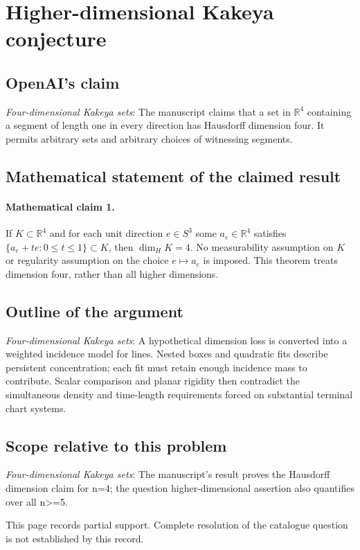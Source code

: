 \documentclass[11pt]{article}
\begin{document}
\section*{Higher-dimensional Kakeya conjecture}

\subsection{OpenAI's claim}
\textit{Four-dimensional Kakeya sets}: The manuscript claims that a set in $\mathbb R^4$ containing a segment of length one in every direction has Hausdorff dimension four. It permits arbitrary sets and arbitrary choices of witnessing segments.

\subsection{Mathematical statement of the claimed result}
\paragraph{Mathematical claim 1.} If $K\subset\mathbb R^4$ and for each unit direction $e\in S^3$ some $a_e\in\mathbb R^4$ satisfies $\{a_e+te:0\le t\le1\}\subset K$, then $\dim_H K=4$. No measurability assumption on $K$ or regularity assumption on the choice $e\mapsto a_e$ is imposed. This theorem treats dimension four, rather than all higher dimensions.

\subsection{Outline of the argument}
\textit{Four-dimensional Kakeya sets}: A hypothetical dimension loss is converted into a weighted incidence model for lines. Nested boxes and quadratic fits describe persistent concentration; each fit must retain enough incidence mass to contribute. Scalar comparison and planar rigidity then contradict the simultaneous density and time-length requirements forced on substantial terminal chart systems.

\subsection{Scope relative to this problem}
\textit{Four-dimensional Kakeya sets}: The manuscript’s result proves the Hausdorff dimension claim for n=4; the question higher-dimensional assertion also quantifies over all n>=5.

This page records partial support. Complete resolution of the catalogue question is not established by this record.
\end{document}

